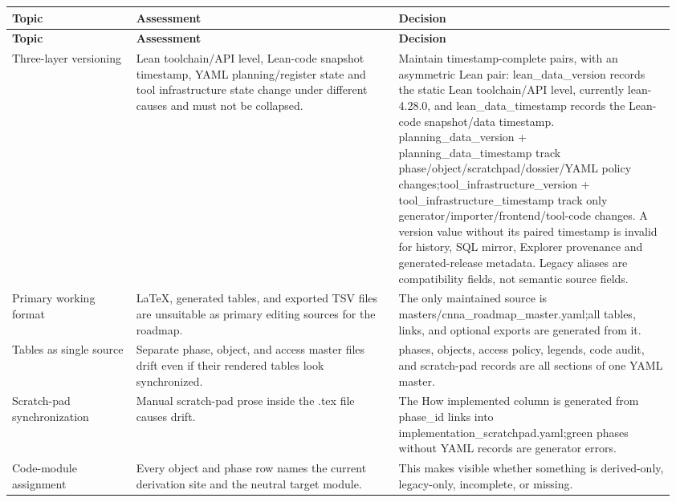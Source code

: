 \small
{}
\begin{longtable}{L{0.18\linewidth} L{0.38\linewidth} L{0.4\linewidth}}
\hline
\textbf{Topic} & \textbf{Assessment} & \textbf{Decision}\\
\hline
\endfirsthead
\hline
\textbf{Topic} & \textbf{Assessment} & \textbf{Decision}\\
\hline
\endhead
Three-layer versioning & Lean toolchain/\allowbreak{}API level, Lean-code snapshot timestamp, YAML planning/\allowbreak{}register state and tool infrastructure state change under different causes and must not be collapsed. & Maintain timestamp-complete pairs, with an asymmetric Lean pair: lean\_data\_version records the static Lean toolchain/\allowbreak{}API level, currently lean-4.28.0, and lean\_data\_timestamp records the Lean-code snapshot/\allowbreak{}data timestamp. planning\_data\_version + planning\_data\_timestamp track phase/\allowbreak{}object/\allowbreak{}scratchpad/\allowbreak{}dossier/\allowbreak{}YAML policy changes;\newline tool\_infrastructure\_version + tool\_infrastructure\_timestamp track only generator/\allowbreak{}importer/\allowbreak{}frontend/\allowbreak{}tool-code changes. A version value without its paired timestamp is invalid for history, SQL mirror, Explorer provenance and generated-release metadata. Legacy aliases are compatibility fields, not semantic source fields.\\
\hline
\addlinespace[0.24em]
Primary working format & LaTeX, generated tables, and exported TSV files are unsuitable as primary editing sources for the roadmap. & The only maintained source is masters/\allowbreak{}cnna\_roadmap\_master.yaml;\newline all tables, links, and optional exports are generated from it.\\
\hline
\addlinespace[0.24em]
Tables as single source & Separate phase, object, and access master files drift even if their rendered tables look synchronized. & phases, objects, access policy, legends, code audit, and scratch-pad records are all sections of one YAML master.\\
\hline
\addlinespace[0.24em]
Scratch-pad synchronization & Manual scratch-pad prose inside the .tex file causes drift. & The How implemented column is generated from phase\_id links into implementation\_scratchpad.yaml;\newline green phases without YAML records are generator errors.\\
\hline
\addlinespace[0.24em]
Code-module assignment & Every object and phase row names the current derivation site and the neutral target module. & This makes visible whether something is derived-only, legacy-only, incomplete, or missing.\\

\end{longtable}
